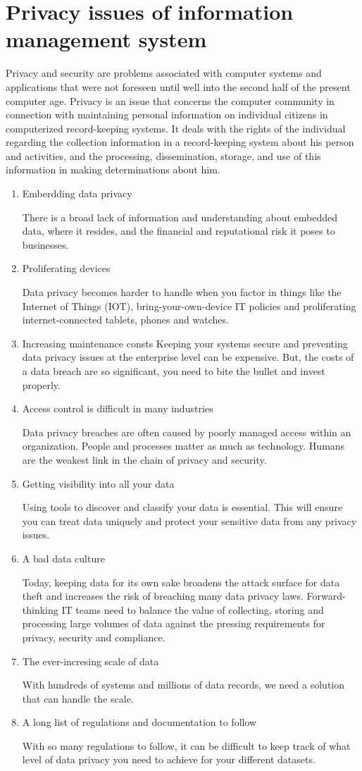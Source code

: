 \documentclass[a4paper]{article}
\begin{document}
\section{Privacy issues of information management system}
Privacy and security are problems associated with computer systems and applications that were not foreseen until well into the second half of the present computer age. Privacy is an issue that concerns the computer community in connection with maintaining personal information on individual citizens in computerized record-keeping systems. It deals with the rights of the individual regarding the collection information in a record-keeping system about his person and activities, and the processing, dissemination, storage, and use of this information in making determinations about him.
\begin{enumerate}
  \item Emberdding data privacy

    There is a broad lack of information and understanding about embedded data, where it resides, and the financial and reputational risk it poses to businesses.
  \item Proliferating devices

    Data privacy becomes harder to handle when you factor in things like the Internet of Things (IOT), bring-your-own-device IT policies and proliferating internet-connected tablets, phones and watches.
  \item Increasing maintenance consts
    Keeping your systems secure and preventing data privacy issues at the enterprise level can be expensive. But, the costs of a data breach are so significant, you need to bite the bullet and invest properly.
  \item Access control is difficult in many industries

    Data privacy breaches are often caused by poorly managed access within an organization. People and processes matter as much as technology. Humans are the weakest link in the chain of privacy and security.
  \item Getting visibility into all your data

    Using tools to discover and classify your data is essential. This will ensure you can treat data uniquely and protect your sensitive data from any privacy issues.
  \item A bad data culture

    Today, keeping data for its own sake broadens the attack surface for data theft and increases the risk of breaching many data privacy laws. Forward-thinking IT teams need to balance the value of collecting, storing and processing large volumes of data against the pressing requirements for privacy, security and compliance.
  \item The ever-incresing scale of data

    With hundreds of systems and millions of data records, we need a solution that can handle the scale.
  \item A long list of regulations and documentation to follow

    With so many regulations to follow, it can be difficult to keep track of what level of data privacy you need to achieve for your different datasets.
\end{enumerate}
\end{document}
